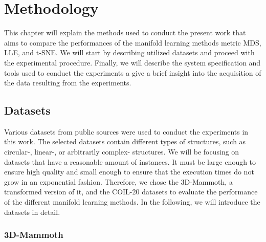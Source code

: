 \chapter{Methodology} \label{cap:methodology}

This chapter will explain the methods used to conduct the present work that aims to compare the performances of the manifold learning methods metric MDS, LLE, and t-SNE. We will start by describing utilized datasets and proceed with the experimental procedure. Finally, we will describe the system specification and tools used to conduct the experiments a give a brief insight into the acquisition of the data resulting from the experiments.

\section{Datasets}

Various datasets from public sources were used to conduct the experiments in this work. The selected datasets contain different types of structures, such as circular-, linear-, or arbitrarily complex- structures. We will be focusing on datasets that have a reasonable amount of instances. It must be large enough to ensure high quality and small enough to ensure that the execution times do not grow in an exponential fashion. Therefore, we chose the 3D-Mammoth, a transformed version of it, and the COIL-20 datasets to evaluate the performance of the different manifold learning methods. In the following, we will introduce the datasets in detail.

\subsection{3D-Mammoth}

